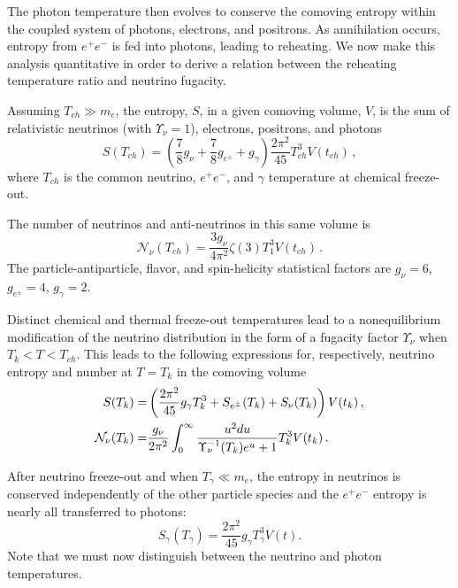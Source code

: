 The photon temperature then evolves to conserve the comoving entropy within the coupled system of photons, electrons, and positrons. As annihilation occurs, entropy from $e^+e^-$ is fed into photons, leading to reheating. We now make this analysis quantitative in order to derive a relation between the reheating temperature ratio and neutrino fugacity.

Assuming $T_{ch}\gg m_e$, the entropy, $S$, in a given comoving volume, $V$, is the sum of relativistic neutrinos (with $\Upsilon_\nu=1$), electrons, positrons, and photons
\begin{equation}
S(T_{ch})=\left(\frac{7}{8}g_\nu+\frac{7}{8}g_{e^\pm} +g_\gamma \right)\frac{2\pi^2}{45} T_{ch}^3V(t_{ch})\,,
\end{equation}
where $T_{ch}$ is the common neutrino, $e^+e^-$, and $\gamma$ temperature at chemical freeze-out. 

The number of neutrinos and anti-neutrinos in this same volume is
\begin{equation}
\mathcal{N}_\nu(T_{ch})=\frac{3g_\nu}{4\pi^2}\zeta(3)T_1^3V(t_{ch})\,.
\end{equation}
The particle-antiparticle, flavor, and spin-helicity statistical factors are $g_\nu=6$, $g_{e^\pm}=4$, $g_\gamma=2$.

Distinct chemical and thermal freeze-out temperatures lead to a nonequilibrium modification of the neutrino distribution in the form of a fugacity factor $\Upsilon_\nu$ when $T_k<T<T_{ch}$. This leads to the following expressions for, respectively, neutrino entropy and number at $T=T_k$ in the comoving volume
\begin{align}
S(T_k)=&\left(\frac{2\pi^2}{45}g_\gamma T_k^3+S_{e^\pm}(T_k)+S_{\nu}(T_k)\right)V(t_k)\,,\\
\mathcal{N}_{\nu}(T_k)=&\frac{g_\nu}{2\pi^2}\int_0^\infty \frac{u^2 du}{\Upsilon_\nu^{-1}(T_k)e^u+1}T_k^3V(t_k)\,.\notag
\end{align}

After neutrino freeze-out and when $T_{\gamma}\ll m_e$, the entropy in neutrinos is conserved independently of the other particle species and the $e^+e^-$ entropy is nearly all transferred to photons:
\begin{equation}
S_{\gamma}(T_\gamma)=\frac{2 \pi^2}{45}g_\gamma T_{\gamma}^3 V(t).
\end{equation}
 Note that we must now distinguish between the neutrino and photon temperatures.

